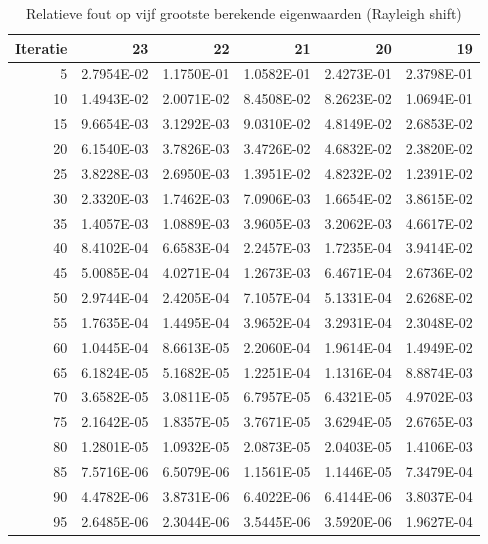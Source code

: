 \documentclass[a4paper, 12pt, titlepage]{report}
\begin{document}
\begin{center}
 \begin{table}
  \begin{tabular}{r||r|r|r|r|r}
  Iteratie & 23&22&21&20&19\\
  \hline
5	&	2.7954E-02	&	1.1750E-01	&	1.0582E-01	&	2.4273E-01	&	2.3798E-01	\\
10	&	1.4943E-02	&	2.0071E-02	&	8.4508E-02	&	8.2623E-02	&	1.0694E-01	\\
15	&	9.6654E-03	&	3.1292E-03	&	9.0310E-02	&	4.8149E-02	&	2.6853E-02	\\
20	&	6.1540E-03	&	3.7826E-03	&	3.4726E-02	&	4.6832E-02	&	2.3820E-02	\\
25	&	3.8228E-03	&	2.6950E-03	&	1.3951E-02	&	4.8232E-02	&	1.2391E-02	\\
30	&	2.3320E-03	&	1.7462E-03	&	7.0906E-03	&	1.6654E-02	&	3.8615E-02	\\
35	&	1.4057E-03	&	1.0889E-03	&	3.9605E-03	&	3.2062E-03	&	4.6617E-02	\\
40	&	8.4102E-04	&	6.6583E-04	&	2.2457E-03	&	1.7235E-04	&	3.9414E-02	\\
45	&	5.0085E-04	&	4.0271E-04	&	1.2673E-03	&	6.4671E-04	&	2.6736E-02	\\
50	&	2.9744E-04	&	2.4205E-04	&	7.1057E-04	&	5.1331E-04	&	2.6268E-02	\\
55	&	1.7635E-04	&	1.4495E-04	&	3.9652E-04	&	3.2931E-04	&	2.3048E-02	\\
60	&	1.0445E-04	&	8.6613E-05	&	2.2060E-04	&	1.9614E-04	&	1.4949E-02	\\
65	&	6.1824E-05	&	5.1682E-05	&	1.2251E-04	&	1.1316E-04	&	8.8874E-03	\\
70	&	3.6582E-05	&	3.0811E-05	&	6.7957E-05	&	6.4321E-05	&	4.9702E-03	\\
75	&	2.1642E-05	&	1.8357E-05	&	3.7671E-05	&	3.6294E-05	&	2.6765E-03	\\
80	&	1.2801E-05	&	1.0932E-05	&	2.0873E-05	&	2.0403E-05	&	1.4106E-03	\\
85	&	7.5716E-06	&	6.5079E-06	&	1.1561E-05	&	1.1446E-05	&	7.3479E-04	\\
90	&	4.4782E-06	&	3.8731E-06	&	6.4022E-06	&	6.4144E-06	&	3.8037E-04	\\
95	&	2.6485E-06	&	2.3044E-06	&	3.5445E-06	&	3.5920E-06	&	1.9627E-04	\\



  \end{tabular}
\caption{Relatieve fout op vijf grootste berekende eigenwaarden (Rayleigh shift)}
\label{errorRayleigh}
 \end{table}

\end{center}
\end{document}

